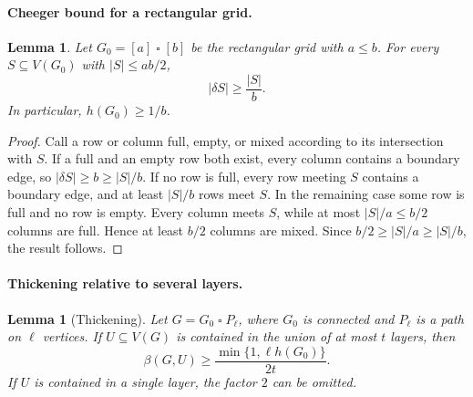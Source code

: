 \documentclass[aps,prx,reprint,superscriptaddress,nofootinbib,floatfix,longbibliography]{revtex4-2}
\newtheorem{lemma}[theorem]{Lemma}
\theoremstyle{definition}
\begin{document}
\paragraph{Cheeger bound for a rectangular grid.}
\begin{lemma}
\label{lem:rectangle-cheeger}
Let $G_0=[a]\mathbin\square[b]$ be the rectangular grid with $a\leq b$.
For every $S\subseteq V(G_0)$ with $|S|\leq ab/2$,
\begin{equation}
 |\delta S|\geq \frac{|S|}{b}.
\end{equation}
In particular, $h(G_0)\geq 1/b$.
\end{lemma}

\begin{proof}
Call a row or column full, empty, or mixed according to its intersection
with $S$.  If a full and an empty row both exist, every column contains a
boundary edge, so $|\delta S|\geq b\geq |S|/b$.  If no row is full, every
row meeting $S$ contains a boundary edge, and at least $|S|/b$ rows meet
$S$.  In the remaining case some row is full and no row is empty.  Every
column meets $S$, while at most $|S|/a\leq b/2$ columns are full.  Hence at
least $b/2$ columns are mixed.  Since
$b/2\geq |S|/a\geq |S|/b$, the result follows.
\end{proof}

\paragraph{Thickening relative to several layers.}
\begin{lemma}[Thickening]
\label{lem:thickening}
Let $G=G_0\mathbin\square P_\ell$, where $G_0$ is connected and $P_\ell$
is a path on $\ell$ vertices.  If $U\subseteq V(G)$ is contained in the
union of at most $t$ layers, then
\begin{equation}
 \beta(G,U)\geq \frac{\min\{1,\ell h(G_0)\}}{2t}.
 \label{eq:thickening}
\end{equation}
If $U$ is contained in a single layer, the factor $2$ can be omitted.
\end{lemma}
\end{document}
